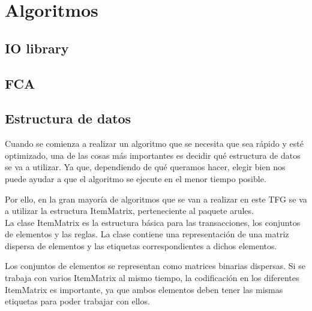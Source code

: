 \section{Algoritmos}
\subsection{IO library}



\subsection{FCA}





\subsection{Estructura de datos}

Cuando se comienza a realizar un algoritmo que se necesita que 
sea r\'apido y est\'e optimizado, una de las cosas m\'as importantes 
es decidir qu\'e estructura de datos se va a utilizar.
Ya que, dependiendo de qu\'e queramos hacer, elegir bien nos puede 
ayudar a que el algoritmo se ejecute en el menor tiempo posible.

Por ello, en la gran mayor\'ia de algoritmos que se van a realizar 
en este TFG se va a utilizar la estructura ItemMatrix, perteneciente al paquete 
arules.
\\

La clase ItemMatrix es la estructura b\'asica para las transacciones, los 
conjuntos de elementos y las reglas.
La clase contiene una representaci\'on de una matriz dispersa de elementos 
y las etiquetas correspondientes a dichos elementos.

Los conjuntos de elementos se representan como matrices binarias dispersas. 
Si se trabaja con varios ItemMatrix al mismo tiempo, la codificaci\'on 
en los diferentes ItemMatrix es importante, ya que ambos elementos deben tener 
las mismas etiquetas para poder trabajar con ellos.


